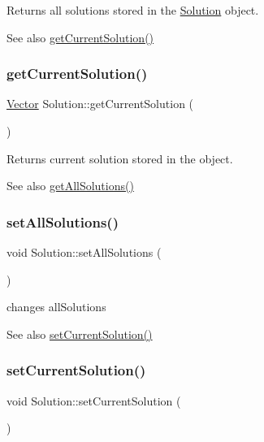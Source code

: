 Returns all solutions stored in the \hyperlink{class_solution}{Solution} object. \begin{DoxySeeAlso}{See also}
\hyperlink{class_solution_a62dfee911f620d7b4caf29e0e891c25e}{get\+Current\+Solution()} 
\end{DoxySeeAlso}
\mbox{\label{class_solution_a62dfee911f620d7b4caf29e0e891c25e}} 
\subsubsection{\texorpdfstring{get\+Current\+Solution()}{getCurrentSolution()}}
{\footnotesize\ttfamily \hyperlink{class_vector}{Vector} Solution\+::get\+Current\+Solution (\begin{DoxyParamCaption}{ }\end{DoxyParamCaption})}

Returns current solution stored in the object. \begin{DoxySeeAlso}{See also}
\hyperlink{class_solution_a6e44ed377115a0f5168eab5e844009bc}{get\+All\+Solutions()} 
\end{DoxySeeAlso}
\mbox{\label{class_solution_a820fbf0f27410781d4f9ed8151d65c67}} 
\subsubsection{\texorpdfstring{set\+All\+Solutions()}{setAllSolutions()}}
{\footnotesize\ttfamily void Solution\+::set\+All\+Solutions (\begin{DoxyParamCaption}{ }\end{DoxyParamCaption})}

changes all\+Solutions \begin{DoxySeeAlso}{See also}
\hyperlink{class_solution_a5a822dac7b42e37e4a8ddd686a00c26f}{set\+Current\+Solution()} 
\end{DoxySeeAlso}
\mbox{\label{class_solution_a5a822dac7b42e37e4a8ddd686a00c26f}} 
\subsubsection{\texorpdfstring{set\+Current\+Solution()}{setCurrentSolution()}}
{\footnotesize\ttfamily void Solution\+::set\+Current\+Solution (\begin{DoxyParamCaption}{ }\end{DoxyParamCaption})}

